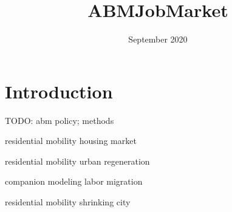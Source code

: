 \documentclass{article}
\title{ABMJobMarket}
\author{}
\date{September 2020}
\begin{document}
\maketitle

\section{Introduction}

TODO: abm policy; methods

\cite{devisch2009agent} residential mobility housing market

\cite{jordan2014agent} residential mobility urban regeneration

\cite{naivinit2010participatory} companion modeling labor migration

\cite{haase2010modeling} residential mobility shrinking city





\end{document}
